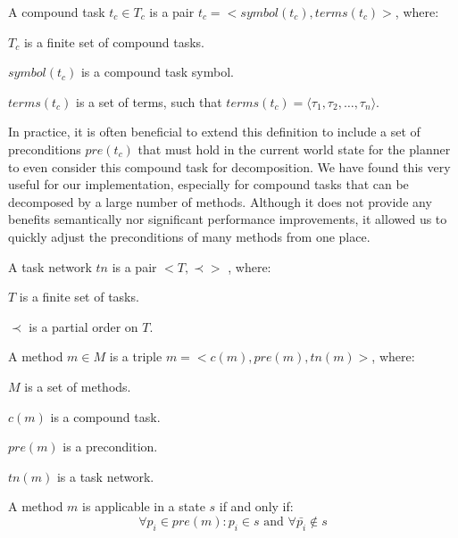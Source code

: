 \begin{Tdef}
    A compound task $t_c \in T_c$ is a pair $t_c = <symbol(t_c),terms(t_c)>$, where:
    \vspace{-0.5em}
    \begin{compactitem}
    \item 
    $T_c$ is a finite set of compound tasks.
    \item 
    $symbol(t_c)$ is a compound task symbol.
    \item 
    $terms(t_c)$  is a set of terms, such that $terms(t_c) = \langle \tau_1, \tau_2, \dots, \tau_n \rangle$.
    \end{compactitem}

    In practice, it is often beneficial to extend this definition to include a set of preconditions $pre(t_c)$ that must hold in the current world state for the planner to even consider this compound task for decomposition. We have found this very useful for our implementation, especially for compound tasks that can be decomposed by a large number of methods. Although it does not provide any benefits semantically nor significant performance improvements, it allowed us to quickly adjust the preconditions of many methods from one place.
\end{Tdef}

\begin{Tdef}
    A task network $tn$ is a pair $<T, \prec>$ , where:
    \vspace{-0.5em}
    \begin{compactitem}
    \item 
    $T$ is a finite set of tasks.
    \item 
    $\prec$ is a partial order on $T$.
    \end{compactitem}
\end{Tdef}

\begin{Tdef}[Method]
    A method $m \in M$ is a triple $m = <c(m), pre(m), tn(m)>$, where:
    \vspace{-0.5em}
    \begin{compactitem}
    \item 
    $M$ is a set of methods.
    \item 
    $c(m)$ is a compound task.
    \item 
    $pre(m)$ is a precondition.
    \item 
    $tn(m)$ is a task network.
    \end{compactitem}
    A method $m$ is applicable in a state $s$ if and only if:
    \vspace{-0.5em}
    $$\forall p_i \in pre(m): p_i\in s \text{ and } \forall \bar{p_i} \notin s$$
\end{Tdef}

